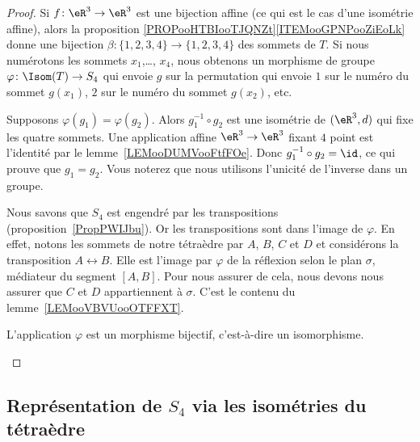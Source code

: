 \begin{proof}
	Si \( f\colon \eR^3\to \eR^3\) est une bijection affine (ce qui est le cas d'une isométrie affine), alors la proposition \ref{PROPooHTBIooTJQNZt}\ref{ITEMooGPNPooZiEoLk} donne une bijection \( \beta\colon \{ 1,2,3,4 \}\to \{ 1,2,3,4 \}\) des sommets de \( T\). Si nous numérotons les sommets \( x_1\),\ldots, \( x_4\), nous obtenons un morphisme de groupe \( \varphi\colon \Isom(T) \to S_4\) qui envoie \( g\) sur la permutation qui envoie \( 1\) sur le numéro du sommet \( g(x_1)\), \( 2\) sur le numéro du sommet \( g(x_2)\), etc.

	\begin{subproof}
		Supposons \( \varphi(g_1)=\varphi(g_2)\). Alors \( g_1^{-1}\circ g_2\) est une isométrie de \( (\eR^3,d)\) qui fixe les quatre sommets. Une application affine \( \eR^3\to\eR^3\) fixant \( 4\) point est l'identité par le lemme~\ref{LEMooDUMVooFtfFOe}. Donc \( g_1^{-1}\circ g_2=\id\), ce qui prouve que \( g_1=g_2\). Vous noterez que nous utilisons l'unicité de l'inverse dans un groupe.


		Nous savons que \( S_4\) est engendré par les transpositions (proposition~\ref{PropPWIJbu}). Or les transpositions sont dans l'image de \( \varphi\). En effet, notons les sommets de notre tétraèdre par \( A\), \( B\), \( C\) et \( D\) et considérons la transposition \( A\leftrightarrow B\). Elle est l'image par \( \varphi\) de la réflexion selon le plan \( \sigma\), médiateur du segment \( [A,B]\). Pour nous assurer de cela, nous devons nous assurer que \( C\) et \( D\) appartiennent à \( \sigma\). C'est le contenu du lemme~\ref{LEMooVBVUooOTFFXT}.

		\spitem[Conclusion]
		L'application \( \varphi\) est un morphisme bijectif, c'est-à-dire un isomorphisme.

	\end{subproof}
\end{proof}

\subsection{Représentation de \( S_4\) via les isométries du tétraèdre}
\label{SUBSECooVEASooDUbsBh}


